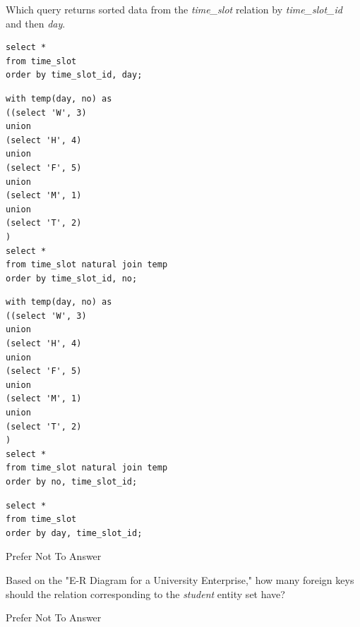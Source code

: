 \documentclass[12pt, addpoints, answers]{exam}
\begin{document}
\begin{questions}
\begin{minipage}{\linewidth}
\question[4]
Which query returns sorted data from the \textit{time\_slot} relation by \textit{time\_slot\_id} and then \textit{day}.\par\vspace{0.5em}
\begin{checkboxes} 
    \choice \begin{verbatim}
select *
from time_slot
order by time_slot_id, day;
    \end{verbatim}
    \CorrectChoice \begin{verbatim}
with temp(day, no) as
((select 'W', 3)
union
(select 'H', 4)
union
(select 'F', 5)
union
(select 'M', 1)
union
(select 'T', 2)
)
select *
from time_slot natural join temp
order by time_slot_id, no;
    \end{verbatim}
    \choice \begin{verbatim}
with temp(day, no) as
((select 'W', 3)
union
(select 'H', 4)
union
(select 'F', 5)
union
(select 'M', 1)
union
(select 'T', 2)
)
select *
from time_slot natural join temp
order by no, time_slot_id;
    \end{verbatim}
    \choice \begin{verbatim}
select *
from time_slot
order by day, time_slot_id;
    \end{verbatim}
    \CorrectChoice Prefer Not To Answer
\end{checkboxes}
\end{minipage}\vspace{1em}

\begin{minipage}{\linewidth}
\question[3]
Based on the "E-R Diagram for a University Enterprise," how many foreign keys should the relation corresponding to the \textit{student} entity set have?\par\vspace{0.5em}
\begin{checkboxes} 
    \CorrectChoice Prefer Not To Answer
\end{checkboxes}
\end{minipage}\vspace{1em}


\end{questions}
\end{document}
